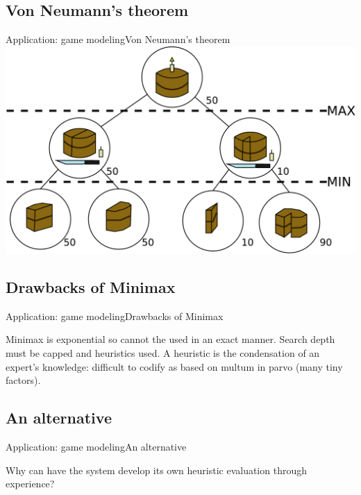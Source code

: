 \subsection{Von Neumann's theorem}
\begin{frame}{Application: game modeling}{Von Neumann's theorem}
\centering
\includegraphics[height=0.6\paperheight]{img/application/cakes.pdf}

\end{frame}

\subsection{Drawbacks of Minimax}
\begin{frame}{Application: game modeling}{Drawbacks of Minimax}

Minimax is exponential so cannot the used in an exact manner. Search depth must 
be capped and heuristics used. A heuristic is the condensation of an expert's 
knowledge: difficult to codify as based on multum in parvo (many tiny factors).

\end{frame}

\subsection{An alternative}
\begin{frame}{Application: game modeling}{An alternative}

Why can have the system develop its own heuristic evaluation through experience?

\end{frame}
